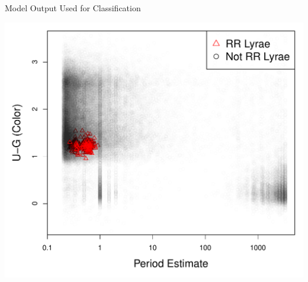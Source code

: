 \documentclass[12pt]{beamer}
\begin{document}
\begin{frame}{Model Output Used for Classification}

\begin{center}
\includegraphics[scale=.4]{figs/sdss_color_period.pdf}
\end{center}



\end{frame}













\end{document}
